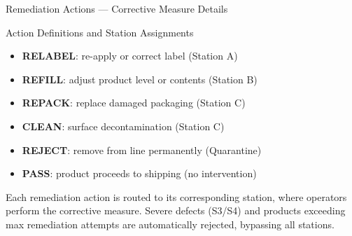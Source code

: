\documentclass[10pt]{beamer}
\begin{document}
\begin{frame}{Remediation Actions --- Corrective Measure Details}

\small
\begin{block}{Action Definitions and Station Assignments}
\begin{itemize}\setlength{\itemsep}{5pt}
    \item \textbf{RELABEL}: re-apply or correct label (Station A)
    \item \textbf{REFILL}: adjust product level or contents (Station B)
    \item \textbf{REPACK}: replace damaged packaging (Station C)
    \item \textbf{CLEAN}: surface decontamination (Station C)
    \item \textbf{REJECT}: remove from line permanently (Quarantine)
    \item \textbf{PASS}: product proceeds to shipping (no intervention)
\end{itemize}
\end{block}

\vspace{8pt}
\small
Each remediation action is routed to its corresponding station, where operators perform the corrective measure. Severe defects (S3/S4) and products exceeding max remediation attempts are automatically rejected, bypassing all stations.

\end{frame}
\end{document}
